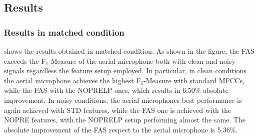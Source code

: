 \subsection{Results}
\subsubsection{Results in matched condition}
 shows the results obtained in matched condition. As shown in the figure, the FAS exceeds the F$_1$-Measure of the aerial microphone both with clean and noisy signals regardless the feature setup employed. In particular, in clean conditions the aerial microphone achieves the highest F$_1$-Measure with standard MFCCs, while the FAS with the NOPRELP ones, which results in 6.50\% absolute improvement. In noisy conditions, the aerial microphones best performance is again achieved with STD features, while the FAS one is achieved with the NOPRE features, with the NOPRELP setup performing almost the same. The absolute improvement of the FAS respect to the aerial microphone is 5.36\%.

